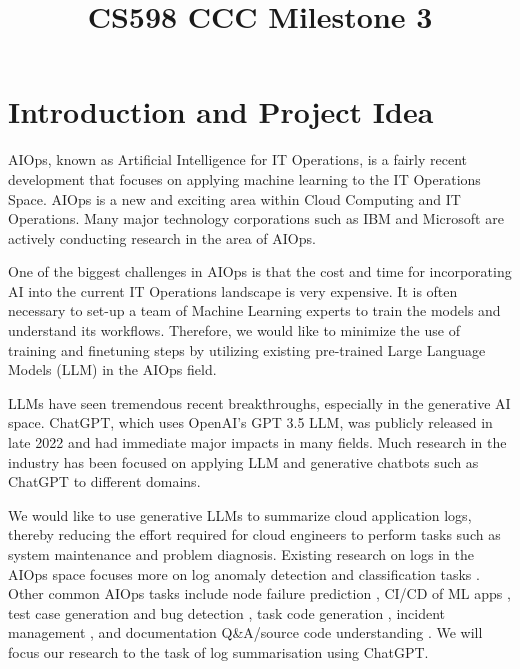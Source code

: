 \documentclass[conference]{IEEEtran}
\begin{document}
\title{CS598 CCC Milestone 3\\
}

\author{
\and
{}
\and
{}
}
\maketitle


\section{Introduction and Project Idea}

AIOps, known as Artificial Intelligence for IT Operations, is a fairly recent development that focuses on applying machine learning to the IT Operations Space. AIOps is a new and exciting area within Cloud Computing and IT Operations. \cite{10212414, 10199929} Many major technology corporations such as IBM and Microsoft \cite{li2022an}  are actively conducting research in the area of AIOps. \cite{aiops-challenges} 

One of the biggest challenges in AIOps is that the cost and time for incorporating AI into the current IT Operations landscape is very expensive. It is often necessary to set-up a team of Machine Learning experts to train the models and understand its workflows. Therefore, we would like to minimize the use of training and finetuning steps by utilizing existing pre-trained Large Language Models (LLM) in the AIOps field.

LLMs have seen tremendous recent breakthroughs, especially in the generative AI space. ChatGPT, which uses OpenAI's GPT 3.5 LLM, was publicly released in late 2022 and had immediate major impacts in many fields. Much research in the industry has been focused on applying LLM and generative chatbots such as ChatGPT to different domains. 

We would like to use generative LLMs to summarize cloud application logs, thereby reducing the effort required for cloud engineers to perform tasks such as system maintenance and problem diagnosis. Existing research on logs in the AIOps space focuses more on log anomaly detection and classification tasks \cite{network-log-anomaly-detection}. Other common AIOps tasks include node failure prediction \cite{aiops-node-failures-alibaba}, CI/CD of ML apps \cite{mlops-ossara}, test case generation and bug detection \cite{model-checking-guided-testing}, task code generation \cite{mani2023enhancing}, incident management \cite{chen2020aiops, li2022an}, and documentation Q\&A/source code understanding \cite{source-code-understanding}. We will focus our research to the task of log summarisation using ChatGPT.
\end{document}
